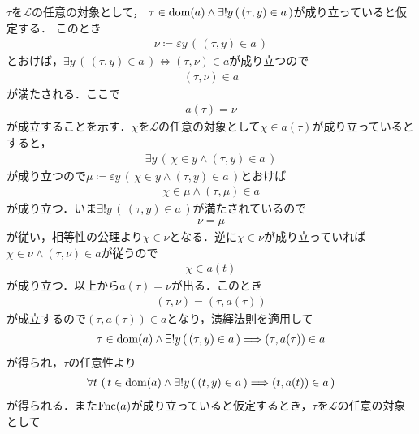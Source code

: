 	\begin{prf}
		$\tau$を$\mathcal{L}$の任意の対象として，
		$\tau \in \operatorname*{dom}(a) \wedge \exists! y\, (\, (\tau,y) \in a\, )$が成り立っていると仮定する．
		このとき
		\begin{align}
			\nu \coloneqq \varepsilon y\, (\, (\tau,y) \in a\, )
		\end{align}
		とおけば，$\exists y\, (\, (\tau,y) \in a\, ) \Longleftrightarrow (\tau,\nu) \in a$が成り立つので
		\begin{align}
			(\tau,\nu) \in a
		\end{align}
		が満たされる．ここで
		\begin{align}
			a(\tau) = \nu
		\end{align}
		が成立することを示す．$\chi$を$\mathcal{L}$の任意の対象として$\chi \in a(\tau)$が成り立っているとすると，
		\begin{align}
			\exists y\, (\, \chi \in y \wedge (\tau,y) \in a\, )
		\end{align}
		が成り立つので$\mu \coloneqq \varepsilon y\, (\, \chi \in y \wedge (\tau,y) \in a\, )$とおけば
		\begin{align}
			\chi \in \mu \wedge (\tau,\mu) \in a
		\end{align}
		が成り立つ．いま$\exists! y\, (\, (\tau,y) \in a\, )$が満たされているので
		\begin{align}
			\nu = \mu
		\end{align}
		が従い，相等性の公理より$\chi \in \nu$となる．逆に$\chi \in \nu$が成り立っていれば
		$\chi \in \nu \wedge (\tau,\nu) \in a$が従うので
		\begin{align}
			\chi \in a(t)
		\end{align}
		が成り立つ．以上から$a(\tau) = \nu$が出る．このとき
		\begin{align}
			(\tau,\nu) = (\tau,a(\tau))
		\end{align}
		が成立するので$(\tau,a(\tau)) \in a$となり，演繹法則を適用して
		\begin{align}
			\tau \in \operatorname*{dom}(a) \wedge \exists! y\, (\, (\tau,y) \in a\, )
			\Longrightarrow (\tau,a(\tau)) \in a
		\end{align}
		が得られ，$\tau$の任意性より
		\begin{align}
			\forall t\, \left(\, t \in \operatorname*{dom}(a) \wedge \exists ! y\, (\, (t,y) \in a\, ) \Longrightarrow (t,a(t)) \in a\, \right)
			\label{eq:thm_value_of_a_mapping}
		\end{align}
		が得られる．また$\operatorname*{Fnc}(a)$が成り立っていると仮定するとき，$\tau$を$\mathcal{L}$の任意の対象として
		\begin{align}

\end{align}
\end{prf}
